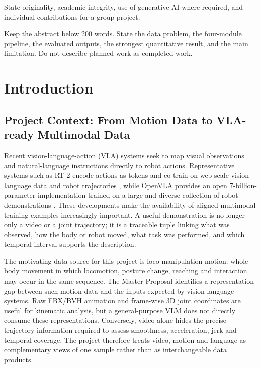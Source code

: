 \documentclass[11pt,oneside]{report}
\begin{document}
\makeprojecttitle
\frontmatterstyle

\begin{declaration}
State originality, academic integrity, use of generative AI where required,
and individual contributions for a group project.
\end{declaration}

\begin{projectabstract}
Keep the abstract below 200 words. State the data problem, the four-module
pipeline, the evaluated outputs, the strongest quantitative result, and the
main limitation. Do not describe planned work as completed work.
\end{projectabstract}

\tableofcontents
\listoffigures
\listoftables

\mainmatterstyle

\chapter{Introduction}
\section{Project Context: From Motion Data to VLA-ready Multimodal Data}
Recent vision-language-action (VLA) systems seek to map visual observations and
natural-language instructions directly to robot actions. Representative systems
such as RT-2 encode actions as tokens and co-train on web-scale vision-language
data and robot trajectories \cite{zitkovich2023rt2}, while OpenVLA provides an
open 7-billion-parameter implementation trained on a large and diverse
collection of robot demonstrations \cite{kim2024openvla}. These developments
make the availability of aligned multimodal training examples increasingly
important. A useful demonstration is no longer only a video or a joint
trajectory; it is a traceable tuple linking what was observed, how the body or
robot moved, what task was performed, and which temporal interval supports the
description.

The motivating data source for this project is loco-manipulation motion:
whole-body movement in which locomotion, posture change, reaching and
interaction may occur in the same sequence. The Master Proposal identifies a
representation gap between such motion data and the inputs expected by
vision-language systems. Raw FBX/BVH animation and frame-wise 3D joint
coordinates are useful for kinematic analysis, but a general-purpose VLM does
not directly consume these representations. Conversely, video alone hides the
precise trajectory information required to assess smoothness, acceleration,
jerk and temporal coverage. The project therefore treats video, motion and
language as complementary views of one sample rather than as interchangeable
data products.
\end{document}
